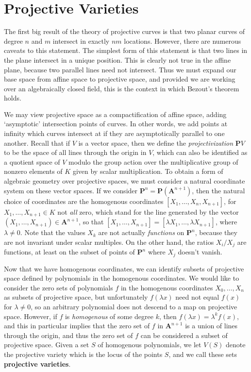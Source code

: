 \chapter{Projective Varieties}

The first big result of the theory of projective curves is that two planar curves of degree $n$ and $m$ intersect in exactly $nm$ locations. However, there are numerous caveats to this statement. The simplest form of this statement is that two lines in the plane intersect in a unique position. This is clearly not true in the affine plane, because two parallel lines need not intersect. Thus we must expand our base space from affine space to projective space, and provided we are working over an algebraically closed field, this is the context in which Bezout's theorem holds.

We may view projective space as a compactification of affine space, adding `asymptotic' intersection points of curves. In other words, we add points at infinity which curves intersect at if they are asymptotically parallel to one another. Recall that if $V$ is a vector space, then we define the {\it projectivization} $\mathbf{P} V$ to be the space of all lines through the origin in $V$, which can also be identified as a quotient space of $V$ modulo the group action over the multiplicative group of nonzero elements of $K$ given by scalar multiplication. To obtain a form of algebraic geometry over projective spaces, we must consider a natural coordinate system on these vector spaces. If we consider $\mathbf{P}^n = \mathbf{P}(\mathbf{A}^{n+1})$, then the natural choice of coordinates are the homogenous coordinates $[X_1, \dots, X_n, X_{n+1}]$, for $X_1, \dots, X_{n+1} \in K$ not {\it all} zero, which stand for the line generated by the vector $(X_1, \dots, X_{n+1}) \in \mathbf{A}^{n+1}$, so that $[X_1, \dots, X_{n+1}] = [\lambda X_1, \dots, \lambda X_{n+1}]$, where $\lambda \neq 0$. Note that the values $X_k$ are not actually {\it functions} on $\mathbf{P}^n$, because they are not invariant under scalar multiples. On the other hand, the ratios $X_i/X_j$ are functions, at least on the subset of points of $\mathbf{P}^n$ where $X_j$ doesn't vanish.

Now that we have homogenous coordinates, we can identify subsets of projective space defined by polynomials in the homogenous coordinates. We would like to consider the zero sets of polynomials $f$ in the homogenous coordinates $X_0, \dots, X_n$ as subsets of projective space, but unfortunately $f(\lambda x)$ need not equal $f(x)$ for $\lambda \neq 0$, so an arbitrary polynomial does not descend to a map on projective space. However, if $f$ is {\it homogenous} of some degree $k$, then $f(\lambda x) = \lambda^k f(x)$, and this in particular implies that the zero set of $f$ in $\mathbf{A}^{n+1}$ is a union of lines through the origin, and thus the zero set of $f$ can be considered a subset of projective space. Given a set $S$ of homogenous polynomials, we let $V(S)$ denote the projective variety which is the locus of the points $S$, and we call these sets {\bf projective varieties}.

